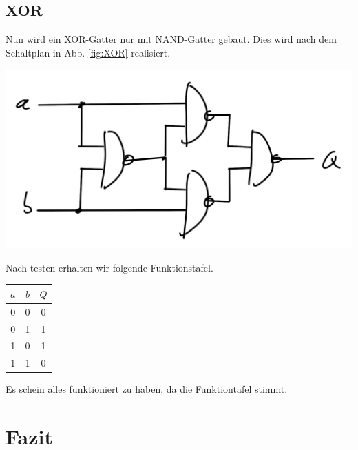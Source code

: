 \documentclass[10pt]{article}
\newenvironment{Figure}
  {\par\medskip\noindent\minipage{\linewidth}}
  {\endminipage\par\medskip}
\begin{document}
\begin{multicols}{2}
  \subsection{XOR}
  Nun wird ein XOR-Gatter nur mit NAND-Gatter gebaut. Dies wird nach dem Schaltplan in Abb. \ref{fig:XOR} realisiert.
	\begin{Figure}
    \centering\includegraphics[width=1\textwidth]{XOR.png}
		\label{fig:XOR}
	\end{Figure}
  Nach testen erhalten wir folgende Funktionstafel.
	\begin{center}
		\begin{tabular}{|c|c|c|}
			\hline
			$a$ & $b$ & $Q$ \\
			\hline
			0   & 0   & 0   \\
			0   & 1   & 1   \\
			1   & 0   & 1   \\
			1   & 1   & 0   \\
			\hline
		\end{tabular}
	\end{center}
  Es schein alles funktioniert zu haben, da die Funktiontafel stimmt.
	\section{Fazit}
\end{multicols}
\end{document}
